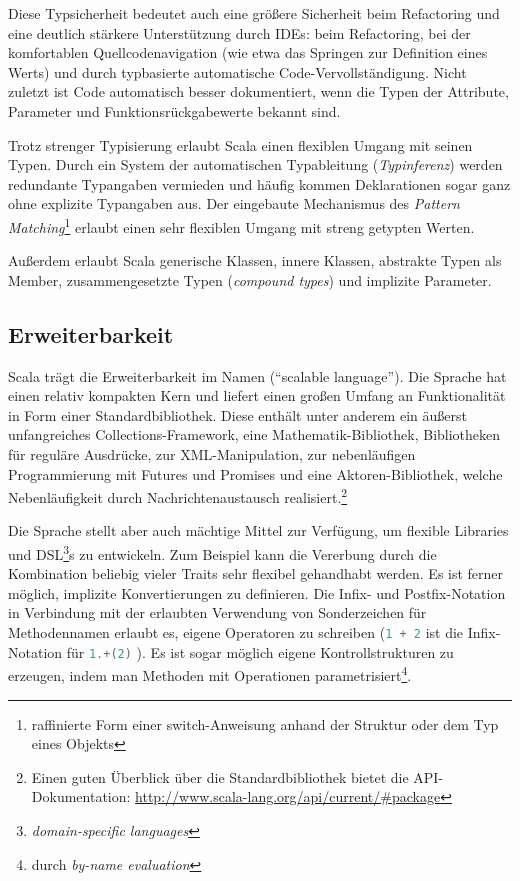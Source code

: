 \documentclass[a4paper, 12pt, hidelinks, listof=totoc, listoftables=totoc, bibliography=totoc]{scrreprt}
\newcommand{\scala}[1]{\lstinline[language=Scala, style=inline]|#1|}
\begin{document}
Diese Typsicherheit bedeutet auch eine größere Sicherheit beim Refactoring und eine deutlich stärkere Unterstützung durch IDEs: beim Refactoring, bei der komfortablen Quellcodenavigation (wie etwa das Springen zur Definition eines Werts) und durch typbasierte automatische Code-Vervollständigung. Nicht zuletzt ist Code automatisch besser dokumentiert, wenn die Typen der Attribute, Parameter und Funktionsrückgabewerte bekannt sind.

Trotz strenger Typisierung erlaubt Scala einen flexiblen Umgang mit seinen Typen. Durch ein System der automatischen Typableitung (\textit{Typinferenz}) werden redundante Typangaben vermieden und häufig kommen Deklarationen sogar ganz ohne explizite Typangaben aus. Der eingebaute Mechanismus des \textit{Pattern Matching}\footnote{raffinierte Form einer switch-Anweisung anhand der Struktur oder dem Typ eines Objekts} erlaubt einen sehr flexiblen Umgang mit streng getypten Werten.

Außerdem erlaubt Scala generische Klassen, innere Klassen, abstrakte Typen als Member, zusammengesetzte Typen (\textit{compound types}) und implizite Parameter.\cite[S. 16 ff., S. 205 ff.]{odersky2008.PIS}\cite[S. 113 ff.]{piepmeyer2010.GFP}\cite{scala-lang2011.CSS}

\subsection{Erweiterbarkeit}

Scala trägt die Erweiterbarkeit im Namen ("`scalable language"').
Die Sprache hat einen relativ kompakten Kern und liefert einen großen Umfang an Funktionalität in Form einer Standardbibliothek. Diese enthält unter anderem ein äußerst unfangreiches Collections-Framework, eine Mathematik-Bibliothek, Bibliotheken für reguläre Ausdrücke, zur XML-Manipulation, zur nebenläufigen Programmierung mit Futures und Promises und eine Aktoren-Bibliothek, welche Nebenläufigkeit durch Nachrichtenaustausch realisiert.\footnote{Einen guten Überblick über die Standardbibliothek bietet die API-Dokumentation: \url{http://www.scala-lang.org/api/current/\#package}}

Die Sprache stellt aber auch mächtige Mittel zur Verfügung, um flexible Libraries und DSL\footnote{\textit{domain-specific languages}}s zu entwickeln. Zum Beispiel kann die Vererbung durch die Kombination beliebig vieler Traits sehr flexibel gehandhabt werden. Es ist ferner möglich, implizite Konvertierungen zu definieren. Die Infix- und Postfix-Notation in Verbindung mit der erlaubten Verwendung von Sonderzeichen für Methodennamen erlaubt es, eigene Operatoren zu schreiben (\scala{1 + 2} ist die Infix-Notation für \scala{1.+(2)} ). Es ist sogar möglich eigene Kontrollstrukturen zu erzeugen, indem man Methoden mit Operationen parametrisiert\footnote{durch \textit{by-name evaluation}}.\cite[S. 4 ff.]{odersky2008.PIS}
\end{document}
